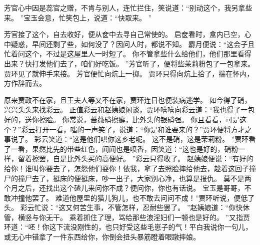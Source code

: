 芳官心中因是蕊官之赠，不肯与别人，连忙拦住，笑说道：“别动这个，我另拿些来。
”宝玉会意，忙笑包上，说道：“快取来。
”\par
芳官接了这个，自去收好，便从奁中去寻自己常使的。
启奁看时，盒内已空，心中疑惑，早间还剩了些，如何没了？因问人时，都说不知。
麝月便说：“这会子且忙着问这个，不过是这屋里人一时短了。
你不管拿些什么给他们，他们那里看得出来？快打发他们去了，咱们好吃饭。
”芳官听了，便将些茉莉粉包了一包拿来。
贾环见了就伸手来接。
芳官便忙向炕上一掷。
贾环只得向炕上拾了，揣在怀内，方作辞而去。
\par
原来贾政不在家，且王夫人等又不在家，贾环连日也便装病逃学。
如今得了硝，兴兴头头来找彩云。
正值彩云和赵姨娘闲谈，贾环嘻嘻向彩云道：“我也得了一包好的，送你擦脸。
你常说，蔷薇硝擦癣，比外头的银硝强。
你且看看，可是这个？”彩云打开一看，嗤的一声笑了，说道：“你是和谁要来的？”贾环便将方才之事说了。
彩云笑道：“这是他们哄你这乡老呢。
这不是硝，这是茉莉粉。
”贾环看了一看，果然比先的带些红色，闻闻也是喷香，因笑道：“这也是好的，硝粉一样，留着擦罢，自是比外头买的高便好。
”彩云只得收了。
赵姨娘便说：“有好的给你！谁叫你要去了，怎怨他们耍你！依我，拿了去照脸摔给他去，趁着这回子撞尸的撞尸去了，挺床的便挺床，吵一出子，大家别心净，也算是报仇。
莫不是两个月之后，还找出这个碴儿来问你不成？便问你，你也有话说。
宝玉是哥哥，不敢冲撞他罢了。
难道他屋里的猫儿狗儿，也不敢去问问不成！”贾环听说，便低了头。
彩云忙说：“这又何苦生事，不管怎样，忍耐些罢了。
”赵姨娘道：“你快休管，横竖与你无干。
乘着抓住了理，骂给那些浪淫妇们一顿也是好的。
”又指贾环道：“呸！你这下流没刚性的，也只好受这些毛崽子的气！平白我说你一句儿，或无心中错拿了一件东西给你，你倒会扭头暴筋瞪着眼蹾摔娘。
